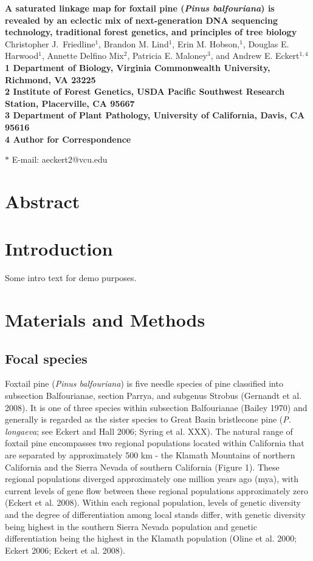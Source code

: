 \documentclass[11pt]{article}
\begin{document}
\begin{flushleft} 
{\Large \textbf{A saturated linkage map for foxtail pine (\textit{Pinus balfouriana}) 
is revealed by an eclectic mix of next-generation DNA sequencing technology, traditional 
forest genetics, and principles of tree biology}}
\\
Christopher J.\ Friedline$^{1}$, 
Brandon M. Lind$^{1}$,
Erin M. Hobson,$^{1}$,
Douglas E. Harwood$^{1}$, 
Annette Delfino Mix$^{2}$,
Patricia E. Maloney$^{3}$, and
Andrew E. Eckert$^{1,4}$
\\
\bf{1} Department of Biology, Virginia Commonwealth University, Richmond, VA 23225
\\
\bf{2} Institute of Forest Genetics, USDA Pacific Southwest Research Station, Placerville, 
CA 95667
\\
\bf{3} Department of Plant Pathology, University of California, Davis, CA 95616
\\
\bf{4} Author for Correspondence

$\ast$ E-mail: aeckert2@vcu.edu
\end{flushleft}

\section{Abstract}

\section{Introduction}
Some intro text for demo purposes.

\section{Materials and Methods}

\subsection{Focal species}
Foxtail pine (\textit{Pinus balfouriana}) is five needle species of pine classified into 
subsection Balfourianae, section Parrya, and subgenus Strobus (Gernandt et al. 2008). It 
is one of three species within subsection Balfourianae (Bailey 1970) and generally is 
regarded as the sister species to Great Basin bristlecone pine (\textit{P. longaeva}; see 
Eckert and Hall 2006; Syring et al. XXX). The natural range of foxtail pine encompasses two 
regional populations located within California that are separated by approximately 500 km - 
the Klamath Mountains of northern California and the Sierra Nevada of southern California 
(Figure 1). These regional populations diverged approximately one million years ago (mya), 
with current levels of gene flow between these regional populations approximately zero 
(Eckert et al. 2008). Within each regional population, levels of genetic diversity and the 
degree of differentiation among local stands differ, with genetic diversity being highest in 
the southern Sierra Nevada population and genetic differentiation being the highest in the 
Klamath population (Oline et al. 2000; Eckert 2006; Eckert et al. 2008).
\end{document}
